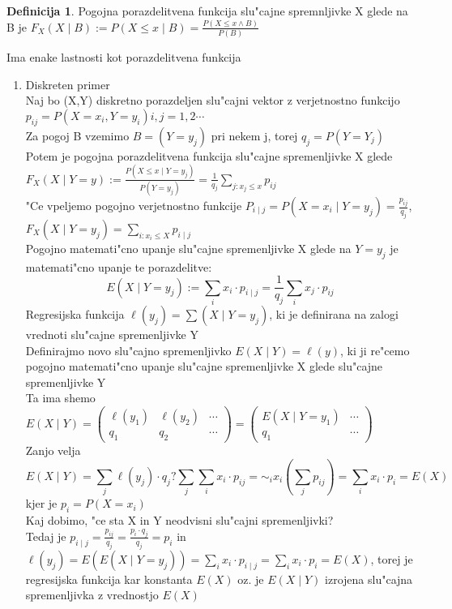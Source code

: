 \documentclass[a4paper,12pt]{article}
\theoremstyle{definition}
\newtheorem{defn}[counter]{Definicija}
\theoremstyle{remark}
\begin{document}
\begin{defn}
    Pogojna porazdelitvena funkcija slu"cajne spremnljivke X glede na B je $F_X(X \mid B) := P(X \leq x \mid B) =
    \frac{P(X \leq x \land B)}{P(B)}$ \\
\end{defn}

Ima enake lastnosti kot porazdelitvena funkcija

\begin{enumerate}[label=\Alph*]
    \item Diskreten primer \\
        Naj bo (X,Y) diskretno porazdeljen slu"cajni vektor z verjetnostno funkcijo $p_{ij} = P(X=x_i, Y=y_i) i,j = 1, 2 \cdots$ \\
        Za pogoj B vzemimo $B = (Y=y_j)$ pri nekem j, torej $q_j = P(Y=Y_j)$ \\
        Potem je pogojna porazdelitvena funkcija slu"cajne spremenljivke X glede $F_X(X \mid Y=y) :=
        \frac{P(X \leq x \mid Y=y_j)}{P(Y=y_j)} = \frac{1}{q_{j}} \sum_{j: x_j \leq x} p_{ij}$ \\
        "Ce vpeljemo pogojno verjetnostno funkcije $P_{i \mid j} = P(X=x_i \mid Y=y_j) = \frac{p_{ij}}{q_j}$,
        $F_X(X \mid Y=y_j) = \sum_{i: x_i \leq X} p_{i \mid j}$ \\
        Pogojno matemati"cno upanje slu"cajne spremenljivke X glede na $Y=y_j$ je matemati"cno upanje te porazdelitve:
        \[E(X \mid Y=y_j) := \sum_{i} x_i \cdot p_{i \mid j} = \frac{1}{q_j} \sum_{i} x_j \cdot p_{ij} \]    %
        Regresijska funkcija $\ell (y_j) = \sum (X \mid Y=y_j)$, ki je definirana na zalogi vrednoti slu"cajne
        spremenljivke Y \\
        Definirajmo novo slu"cajno spremenljivko $E(X \mid Y) = \ell (y)$, ki ji re"cemo pogojno matemati"cno upanje
        slu"cajne spremenljivke X glede slu"cajne spremenljivke Y \\
        Ta ima shemo $E(X \mid Y) = \begin{pmatrix} \ell (y_1) & \ell (y_2) & \cdots \\ q_1 & q_2 & \cdots
        \end{pmatrix} = \begin{pmatrix} E(X \mid Y=y_1) & \cdots \\ q_1 & \cdots
        \end{pmatrix}$ \\
        Zanjo velja
        \[E(X \mid Y) = \sum_j \ell (y_j) \cdot q_j ? \sum_j \sum_i x_i \cdot p_{ij} = \sim_i x_i (\sum_j p_{ij}) =
        \sum_i x_i \cdot p_i = E(X)\]
        kjer je $p_i = P(X=x_i)$ \\
        Kaj dobimo, "ce sta X in Y neodvisni slu"cajni spremenljivki? \\
        Tedaj je $p_{i \mid j} = \frac{p_{ij}}{q_j} = \frac{p_i \cdot q_j}{q_j} = p_i$ in
        $\ell (y_j) = E(E(X \mid Y=y_j)) = \sum_i x_i \cdot p_{i \mid j} = \sum_i x_i \cdot p_i = E(X)$, torej je
        regresijska funkcija kar konstanta $E(X)$ oz. je $E(X \mid Y)$ izrojena slu"cajna spremenljivka z vrednostjo $E(X)$


\end{enumerate}
\end{document}
